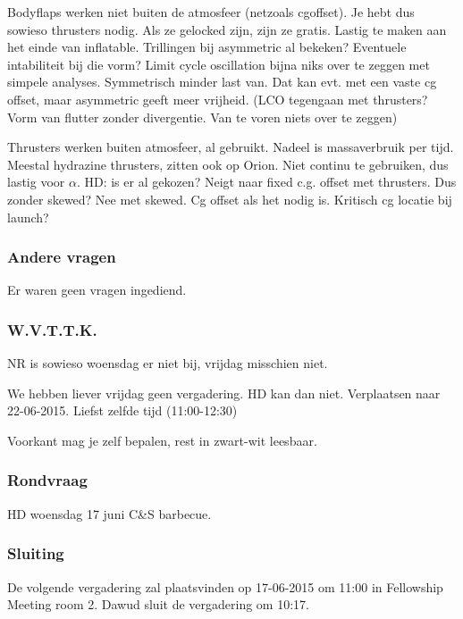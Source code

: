 Bodyflaps werken niet buiten de atmosfeer (netzoals cgoffset). Je hebt dus sowieso thrusters nodig. Als ze gelocked zijn, zijn ze gratis. Lastig te maken aan het einde van inflatable. 
Trillingen bij asymmetric al bekeken? Eventuele intabiliteit bij die vorm? Limit cycle oscillation bijna niks over te zeggen met simpele analyses. Symmetrisch minder last van. Dat kan evt. met een vaste cg offset, maar asymmetric geeft meer vrijheid. (LCO tegengaan met thrusters? Vorm van flutter zonder divergentie. Van te voren niets over te zeggen)

Thrusters werken buiten atmosfeer, al gebruikt. Nadeel is massaverbruik per tijd. Meestal hydrazine thrusters, zitten ook op Orion. Niet continu te gebruiken, dus lastig voor $\alpha$. 
HD: is er al gekozen? Neigt naar fixed c.g. offset met thrusters. Dus zonder skewed? Nee met skewed. Cg offset als het nodig is. Kritisch cg locatie bij launch?


\subsubsection{Andere vragen}
Er waren geen vragen ingediend.

\subsubsection{W.V.T.T.K.}
NR is sowieso woensdag er niet bij, vrijdag misschien niet.

We hebben liever vrijdag geen vergadering. HD kan dan niet. Verplaatsen naar 22-06-2015. Liefst zelfde tijd (11:00-12:30)

Voorkant mag je zelf bepalen, rest in zwart-wit leesbaar.

\subsubsection{Rondvraag}
HD woensdag 17 juni C\&S barbecue. 

\subsubsection{Sluiting}
De volgende vergadering zal plaatsvinden op 17-06-2015 om 11:00 in Fellowship Meeting room 2.
\newline\newline
Dawud sluit de vergadering om 10:17.